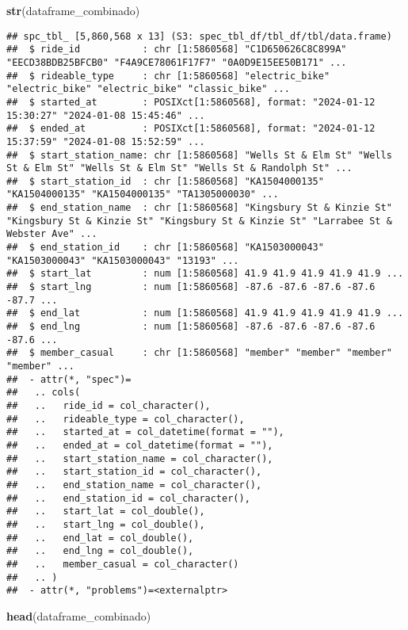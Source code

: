 \documentclass[
]{article}
\newenvironment{Shaded}{\begin{snugshade}}{\end{snugshade}}
\newcommand{\FunctionTok}[1]{\textcolor[rgb]{0.13,0.29,0.53}{\textbf{#1}}}
\newcommand{\NormalTok}[1]{#1}
\begin{document}
\begin{Shaded}
\begin{Highlighting}[]
\FunctionTok{str}\NormalTok{(dataframe\_combinado)}
\end{Highlighting}
\end{Shaded}

\begin{verbatim}
## spc_tbl_ [5,860,568 x 13] (S3: spec_tbl_df/tbl_df/tbl/data.frame)
##  $ ride_id           : chr [1:5860568] "C1D650626C8C899A" "EECD38BDB25BFCB0" "F4A9CE78061F17F7" "0A0D9E15EE50B171" ...
##  $ rideable_type     : chr [1:5860568] "electric_bike" "electric_bike" "electric_bike" "classic_bike" ...
##  $ started_at        : POSIXct[1:5860568], format: "2024-01-12 15:30:27" "2024-01-08 15:45:46" ...
##  $ ended_at          : POSIXct[1:5860568], format: "2024-01-12 15:37:59" "2024-01-08 15:52:59" ...
##  $ start_station_name: chr [1:5860568] "Wells St & Elm St" "Wells St & Elm St" "Wells St & Elm St" "Wells St & Randolph St" ...
##  $ start_station_id  : chr [1:5860568] "KA1504000135" "KA1504000135" "KA1504000135" "TA1305000030" ...
##  $ end_station_name  : chr [1:5860568] "Kingsbury St & Kinzie St" "Kingsbury St & Kinzie St" "Kingsbury St & Kinzie St" "Larrabee St & Webster Ave" ...
##  $ end_station_id    : chr [1:5860568] "KA1503000043" "KA1503000043" "KA1503000043" "13193" ...
##  $ start_lat         : num [1:5860568] 41.9 41.9 41.9 41.9 41.9 ...
##  $ start_lng         : num [1:5860568] -87.6 -87.6 -87.6 -87.6 -87.7 ...
##  $ end_lat           : num [1:5860568] 41.9 41.9 41.9 41.9 41.9 ...
##  $ end_lng           : num [1:5860568] -87.6 -87.6 -87.6 -87.6 -87.6 ...
##  $ member_casual     : chr [1:5860568] "member" "member" "member" "member" ...
##  - attr(*, "spec")=
##   .. cols(
##   ..   ride_id = col_character(),
##   ..   rideable_type = col_character(),
##   ..   started_at = col_datetime(format = ""),
##   ..   ended_at = col_datetime(format = ""),
##   ..   start_station_name = col_character(),
##   ..   start_station_id = col_character(),
##   ..   end_station_name = col_character(),
##   ..   end_station_id = col_character(),
##   ..   start_lat = col_double(),
##   ..   start_lng = col_double(),
##   ..   end_lat = col_double(),
##   ..   end_lng = col_double(),
##   ..   member_casual = col_character()
##   .. )
##  - attr(*, "problems")=<externalptr>
\end{verbatim}

\begin{Shaded}
\begin{Highlighting}[]
\FunctionTok{head}\NormalTok{(dataframe\_combinado)}
\end{Highlighting}
\end{Shaded}
\end{document}
